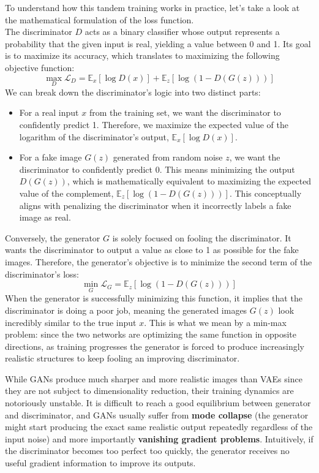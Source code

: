 To understand how this tandem training works in practice, let's take a look at the mathematical formulation of the loss function. \\
The discriminator $D$ acts as a binary classifier whose output represents a probability that the given input is real, yielding a value between 0 and 1. Its goal is to maximize its accuracy, which translates to maximizing the following objective function:
\begin{equation}
    \max_D \mathcal{L}_D = \mathbb{E}_{x}[\log D(x)] + \mathbb{E}_{z}[\log(1 - D(G(z)))]
\end{equation}
We can break down the discriminator's logic into two distinct parts:
\begin{itemize}
    \item[-] For a real input $x$ from the training set, we want the discriminator to confidently predict 1. Therefore, we maximize the expected value of the logarithm of the discriminator's output, $\mathbb{E}_{x}[\log D(x)]$. 
    \item[-] For a fake image $G(z)$ generated from random noise $z$, we want the discriminator to confidently predict 0. This means minimizing the output $D(G(z))$, which is mathematically equivalent to maximizing the expected value of the complement, $\mathbb{E}_{z}[\log(1 - D(G(z)))]$. This conceptually aligns with penalizing the discriminator when it incorrectly labels a fake image as real.
\end{itemize}
Conversely, the generator $G$ is solely focused on fooling the discriminator. It wants the discriminator to output a value as close to 1 as possible for the fake images. Therefore, the generator's objective is to minimize the second term of the discriminator's loss:
\begin{equation}
    \min_G \mathcal{L}_G = \mathbb{E}_{z}[\log(1 - D(G(z)))]    
\end{equation}
When the generator is successfully minimizing this function, it implies that the discriminator is doing a poor job, meaning the generated images $G(z)$ look incredibly similar to the true input $x$. This is what we mean by a min-max problem: since the two networks are optimizing the same function in opposite directions, as training progresses the generator is forced to produce increasingly realistic structures to keep fooling an improving discriminator.

While GANs produce much sharper and more realistic images than VAEs since they are not subject to dimensionality reduction, their training dynamics are notoriously unstable. It is difficult to reach a good equilibrium between generator and discriminator, and GANs usually suffer from \textbf{mode collapse} (the generator might start producing the exact same realistic output repeatedly regardless of the input noise) and more importantly \textbf{vanishing gradient problems}. Intuitively, if the discriminator becomes too perfect too quickly, the generator receives no useful gradient information to improve its outputs.


